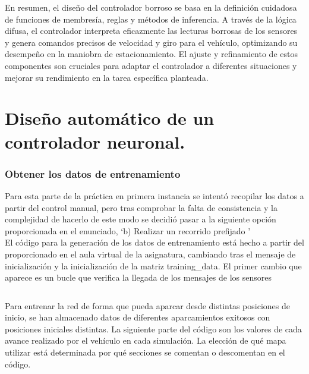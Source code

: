 \documentclass[a4paper, 12pt]{article}
\begin{document}
    
    En resumen, el diseño del controlador borroso se basa en la definición cuidadosa de funciones de membresía, reglas y métodos de inferencia. A través de la lógica difusa, el controlador interpreta eficazmente las lecturas borrosas de los sensores y genera comandos precisos de velocidad y giro para el vehículo, optimizando su desempeño en la maniobra de estacionamiento. El ajuste y refinamiento de estos componentes son cruciales para adaptar el controlador a diferentes situaciones y mejorar su rendimiento en la tarea específica planteada.
    
	\newpage
                
    \part{Diseño automático de un controlador neuronal.}
	
    \section{Obtener los datos de entrenamiento}
        Para esta parte de la práctica en primera instancia se intentó recopilar los datos a partir del control manual, pero tras comprobar la falta de consistencia y la complejidad de hacerlo de este modo se decidió pasar a la siguiente opción proporcionada en el enunciado, \textquoteleft b) Realizar un recorrido prefijado \textquoteright \\
        
    	El código para la generación de los datos de entrenamiento está hecho a partir del proporcionado en el aula virtual de la asignatura, cambiando tras el mensaje de inicialización y la inicialización de la matriz training\_data. El primer cambio que aparece es un bucle que verifica la llegada de los mensajes de los sensores
    
        \inputminted[fontsize=\scriptsize, linenos, breaklines=true, xleftmargin=0.75cm, frame=lines, firstline=70, lastline=77]{matlab}{code/maniobra_park_ackerman_datos_entrenamiento_alumnos.m}
    
        Para entrenar la red de forma que pueda aparcar desde distintas posiciones de inicio, se han almacenado datos de diferentes aparcamientos exitosos con posiciones iniciales distintas. La siguiente parte del código son los valores de cada avance realizado por el vehículo en cada simulación. La elección de qué mapa utilizar está determinada por qué secciones se comentan o descomentan en el código.
    
\end{document}
